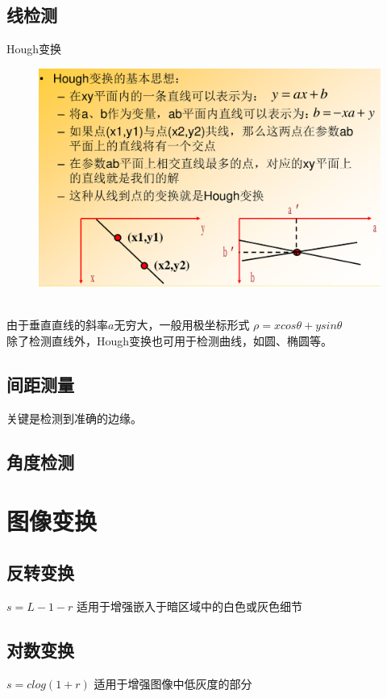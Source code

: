\documentclass[11pt]{article}
\begin{document}
\subsection{线检测}
Hough变换
\begin{figure}[htb]
    \centering
    \includegraphics[scale=0.1]{imgs/hough.png}
\end{figure}
\\
由于垂直直线的斜率$a$无穷大，一般用极坐标形式 $\rho = xcos\theta + ysin\theta$  \\
除了检测直线外，Hough变换也可用于检测曲线，如圆、椭圆等。

\subsection{间距测量}
关键是检测到准确的边缘。

\subsection{角度检测}


\section{图像变换}

\subsection{反转变换}
$s=L-1-r$ \qquad 适用于增强嵌入于暗区域中的白色或灰色细节

\subsection{对数变换}
$s=clog(1+r)$  \qquad  适用于增强图像中低灰度的部分
\end{document}
